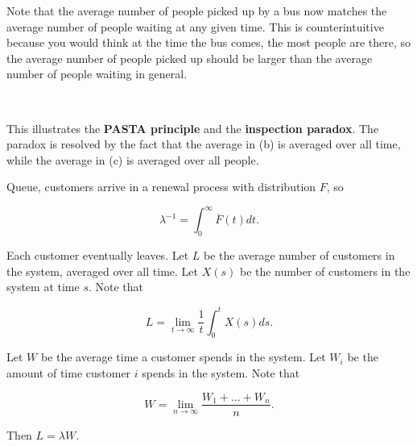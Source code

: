 \begin{solution}
\begin{enumerate}[(a)]
\begin{remark}Note that the average number of people picked up by a bus now matches the average number of people waiting at any given time. This is counterintuitive because you would think at the time the bus comes, the most people are there, so the average number of people picked up should be larger than the average number of people waiting in general. 

\

This illustrates the \textbf{PASTA principle} and the \textbf{inspection paradox}. The paradox is resolved by the fact that the average in (b) is averaged over all time, while the average in (c) is averaged over all people.

\end{remark}

\end{enumerate}

\end{solution}

\begin{theorem} Queue, customers arrive in a renewal process with distribution \(F\), so 

\[
\lambda^{-1} = \int_0^\infty \overline{F}(t) dt.
\]

Each customer eventually leaves. Let \(L\) be the average number of customers in the system, averaged over all time. Let \(X(s)\) be the number of customers in the system at time \(s\). Note that

\[
L = \lim_{t \to \infty} \frac{1}{t} \int_0^t X(s) ds.
\]

Let \(W\) be the average time a customer spends in the system. Let \(W_i\) be the amount of time customer \(i\) spends in the system. Note that

\[
W = \lim_{n \to \infty} \frac{W_1 + \ldots + W_n}{n}.
\]

Then \(L = \lambda W\).

\end{theorem}

